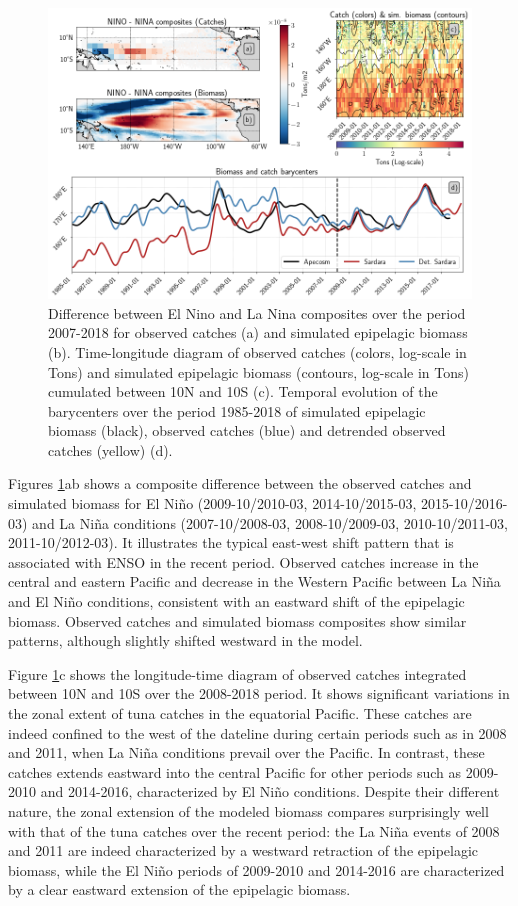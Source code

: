 \begin{figure}[h!tp]
	\centering
	\includegraphics[scale=0.4]{figs/plot_validation_apecosm.png}
	\caption{Difference between El Nino and La Nina composites over the period 2007-2018 for observed catches (a) and simulated epipelagic biomass (b). Time-longitude diagram of observed catches (colors, log-scale in Tons) and simulated epipelagic biomass (contours, log-scale in Tons) cumulated between 10N and 10S (c). Temporal evolution of the barycenters over the period 1985-2018 of simulated epipelagic biomass (black), observed catches (blue) and detrended observed catches (yellow) (d).}
	\label{fig:apecosm_validation}
\end{figure}

Figures \ref{fig:apecosm_validation}ab shows a composite difference between the observed catches and simulated biomass for El Niño (2009-10/2010-03, 2014-10/2015-03, 2015-10/2016-03) and La Niña conditions (2007-10/2008-03, 2008-10/2009-03, 2010-10/2011-03, 2011-10/2012-03). It illustrates the typical east-west shift pattern that is associated with ENSO in the recent period. Observed catches increase in the central and eastern Pacific and decrease in the Western Pacific between La Niña and El Niño conditions, consistent with an eastward shift of the epipelagic biomass. Observed catches and simulated biomass composites show similar patterns, although slightly shifted westward in the model.

Figure \ref{fig:apecosm_validation}c shows the longitude-time diagram of observed catches integrated between 10N and 10S over the 2008-2018 period. It shows significant variations in the zonal extent of tuna catches in the equatorial Pacific. These catches are indeed confined to the west of the dateline during certain periods such as in 2008 and 2011, when La Niña conditions prevail over the Pacific. In contrast, these catches extends eastward into the central Pacific for other periods such as 2009-2010 and 2014-2016, characterized by El Niño conditions. Despite their different nature, the zonal extension of the modeled biomass compares surprisingly well with that of the tuna catches over the recent period: the La Niña events of 2008 and 2011 are indeed characterized by a westward retraction of the epipelagic biomass, while the El Niño periods of 2009-2010 and 2014-2016 are characterized by a clear eastward extension of the epipelagic biomass. 


